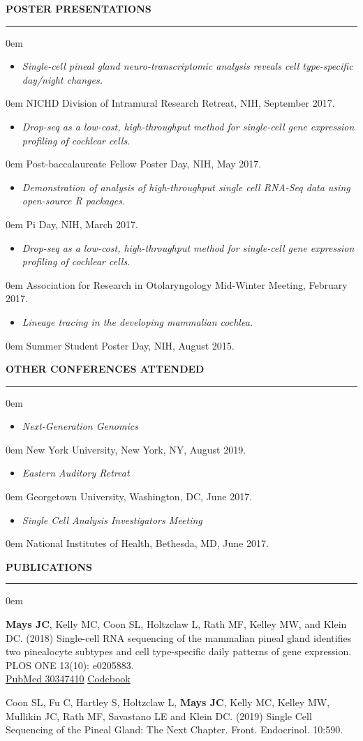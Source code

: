 \documentclass[11pt, letterpaper]{article}
\newenvironment{CVSection}{
\begin{addmargin}[2em]{0em}
\begin{samepage}}
{\end{samepage}
\end{addmargin}\bigskip}
\newcommand{\CVList}[2]{
\begin{samepage}
\begin{itemize}[leftmargin=*]
\item \textsl{#1}
\end{itemize}
\begin{addmargin}[2.5em]{0em}
#2
\end{addmargin}
\end{samepage}
}
\newcommand{\CVHeading}[1]{
\MakeUppercase{\bf #1}
\smallskip
\hrule
\medskip
}
\begin{document}
\pagebreak
\CVHeading{Poster Presentations}
\begin{CVSection}
\CVList{Single-cell pineal gland neuro-transcriptomic analysis reveals cell type-specific day/night changes.}{NICHD Division of Intramural Research Retreat, NIH, September 2017.}
\CVList{Drop-seq as a low-cost, high-throughput method for single-cell gene expression profiling of cochlear cells.}{Post-baccalaureate Fellow Poster Day, NIH, May 2017.}
\CVList{Demonstration of analysis of high-throughput single cell RNA-Seq data using open-source R packages.}{Pi Day, NIH, March 2017.}
\CVList{Drop-seq as a low-cost, high-throughput method for single-cell gene expression profiling of cochlear cells.}{Association for Research in Otolaryngology Mid-Winter Meeting, February 2017.}
\CVList{Lineage tracing in the developing mammalian cochlea.}{Summer Student Poster Day, NIH, August 2015.}
\end{CVSection}

\CVHeading{Other Conferences Attended}
\begin{CVSection}
\CVList{Next-Generation Genomics}{New York University, New York, NY, August 2019.}
\CVList{Eastern Auditory Retreat}{Georgetown University, Washington, DC, June 2017.}
\CVList{Single Cell Analysis Investigators Meeting}{National Institutes of Health, Bethesda, MD, June 2017.}
\end{CVSection}



\CVHeading{Publications}
\begin{CVSection}


\textbf{Mays JC}, Kelly MC, Coon SL, Holtzclaw L, Rath MF, Kelley MW, and Klein DC. (2018) Single-cell RNA sequencing of the mammalian pineal gland identifies two pinealocyte subtypes and cell type-specific daily patterns of gene expression. PLOS ONE 13(10): e0205883.\\
\hspace{2 in}\faFileTextO\hspace{1mm}\href{https://www.ncbi.nlm.nih.gov/pubmed/30347410}{PubMed 30347410}
\hspace{2mm}\faCode\hspace{1mm}\href{https://github.com/joeymays/PinealGland_SingleCell}{Codebook}\medskip

Coon SL, Fu C, Hartley S, Holtzclaw L, \textbf{Mays JC}, Kelly MC, Kelley MW, Mullikin JC, Rath MF, Savastano LE and Klein DC. (2019) Single Cell Sequencing of the Pineal Gland: The Next Chapter. Front. Endocrinol. 10:590.

\end{CVSection}
\end{document}
